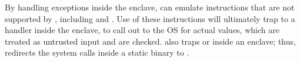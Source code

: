 By handling exceptions inside the enclave, \graphenesgx{} can emulate instructions that are not supported by \sgx{}, including  and .
Use of these instructions will ultimately trap to a handler inside the enclave,
to call out to the OS for actual values, which are treated as untrusted input and are checked.
\sgx{} also traps  or  inside an enclave;
thus, \graphenesgx{} redirects the system calls inside a static binary
to \thelibos{}.



